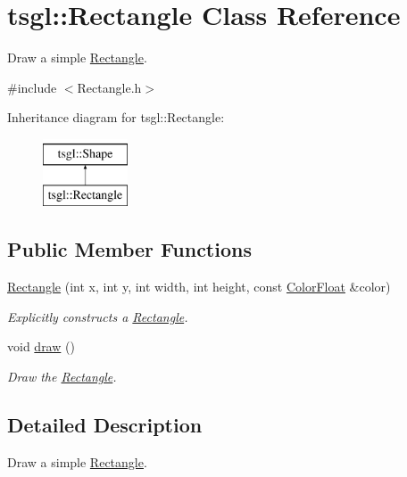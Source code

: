\hypertarget{classtsgl_1_1_rectangle}{\section{tsgl\-:\-:\-Rectangle \-Class \-Reference}
\label{classtsgl_1_1_rectangle}
}


\-Draw a simple \hyperlink{classtsgl_1_1_rectangle}{\-Rectangle}.  




{\ttfamily \#include $<$\-Rectangle.\-h$>$}

\-Inheritance diagram for tsgl\-:\-:\-Rectangle\-:\begin{figure}[H]
\begin{center}
\leavevmode
\includegraphics[height=2.000000cm]{classtsgl_1_1_rectangle}
\end{center}
\end{figure}
\subsection*{\-Public \-Member \-Functions}
\begin{DoxyCompactItemize}
\item 
\hyperlink{classtsgl_1_1_rectangle_a1fb2a492ffc57b2da380ea23d89e887b}{\-Rectangle} (int x, int y, int width, int height, const \hyperlink{structtsgl_1_1_color_float}{\-Color\-Float} \&color)
\begin{DoxyCompactList}\small\item\em \-Explicitly constructs a \hyperlink{classtsgl_1_1_rectangle}{\-Rectangle}. \end{DoxyCompactList}\item 
void \hyperlink{classtsgl_1_1_rectangle_addad1e65bc50d3669e6350aa32249c7f}{draw} ()
\begin{DoxyCompactList}\small\item\em \-Draw the \hyperlink{classtsgl_1_1_rectangle}{\-Rectangle}. \end{DoxyCompactList}\end{DoxyCompactItemize}


\subsection{\-Detailed \-Description}
\-Draw a simple \hyperlink{classtsgl_1_1_rectangle}{\-Rectangle}. 

